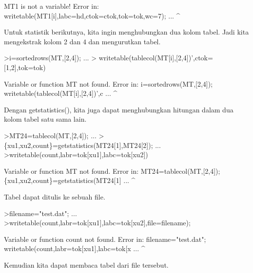 \documentclass[a4paper,10pt]{article}
\begin{document}
\begin{eulernotebook}
\begin{eulercomment}
\begin{eulercomment}
\begin{eulercomment}
\begin{eulercomment}
\begin{eulercomment}
\begin{eulercomment}
\begin{eulercomment}
\begin{eulercomment}
\begin{eulercomment}
\begin{eulercomment}
\begin{eulercomment}
\begin{eulercomment}
\begin{eulercomment}
\begin{eulercomment}
\begin{eulercomment}
\begin{eulercomment}
\begin{eulercomment}
\begin{eulercomment}
\begin{eulerprompt}
\end{eulerprompt}
\begin{euleroutput}
  MT1 is not a variable!
  Error in:
  writetable(MT1[i],labc=hd,ctok=ctok,tok=tok,wc=7); ...
                   ^
\end{euleroutput}
\begin{eulercomment}
Untuk statistik berikutnya, kita ingin menghubungkan dua kolom tabel.
Jadi kita mengekstrak kolom 2 dan 4 dan mengurutkan tabel.
\end{eulercomment}
\begin{eulerprompt}
>i=sortedrows(MT,[2,4]);  ...
>  writetable(tablecol(MT[i],[2,4])',ctok=[1,2],tok=tok)
\end{eulerprompt}
\begin{euleroutput}
  Variable or function MT not found.
  Error in:
  i=sortedrows(MT,[2,4]);    writetable(tablecol(MT[i],[2,4])',c ...
                 ^
\end{euleroutput}
\begin{eulercomment}
Dengan getstatistics(), kita juga dapat menghubungkan hitungan dalam
dua kolom tabel satu sama lain.
\end{eulercomment}
\begin{eulerprompt}
>MT24=tablecol(MT,[2,4]); ...
>\{xu1,xu2,count\}=getstatistics(MT24[1],MT24[2]); ...
>writetable(count,labr=tok[xu1],labc=tok[xu2])
\end{eulerprompt}
\begin{euleroutput}
  Variable or function MT not found.
  Error in:
  MT24=tablecol(MT,[2,4]); \{xu1,xu2,count\}=getstatistics(MT24[1] ...
                  ^
\end{euleroutput}
\begin{eulercomment}
Tabel dapat ditulis ke sebuah file.
\end{eulercomment}
\begin{eulerprompt}
>filename="test.dat"; ...
>writetable(count,labr=tok[xu1],labc=tok[xu2],file=filename);
\end{eulerprompt}
\begin{euleroutput}
  Variable or function count not found.
  Error in:
  filename="test.dat"; writetable(count,labr=tok[xu1],labc=tok[x ...
                                       ^
\end{euleroutput}
\begin{eulercomment}
Kemudian kita dapat membaca tabel dari file tersebut.
\end{eulercomment}

\end{eulercomment}
\end{eulercomment}
\end{eulercomment}
\end{eulercomment}
\end{eulercomment}
\end{eulercomment}
\end{eulercomment}
\end{eulercomment}
\end{eulercomment}
\end{eulercomment}
\end{eulercomment}
\end{eulercomment}
\end{eulercomment}
\end{eulercomment}
\end{eulercomment}
\end{eulercomment}
\end{eulercomment}
\end{eulercomment}
\end{eulernotebook}
\end{document}
